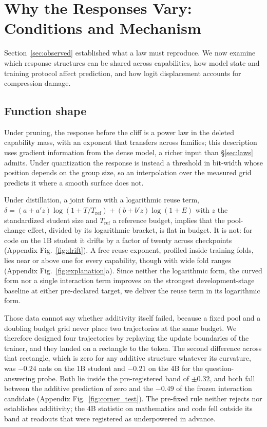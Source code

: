 \section{Why the Responses Vary: Conditions and Mechanism}
\label{sec:why}

Section~\ref{sec:observed} established what a law must reproduce. We now examine which response structures can be shared across capabilities, how model state and training protocol affect prediction, and how logit displacement accounts for compression damage.


\subsection{Function shape}
\label{sec:why_shape}

Under pruning, the response before the cliff is a power law in the deleted capability mass, with an
exponent that transfers across families; this description uses gradient information from the dense
model, a richer input than \S\ref{sec:laws} admits. Under quantization the response is instead a
threshold in bit-width whose position depends on the group size, so an interpolation over the
measured grid predicts it where a smooth surface does not.

Under distillation, a joint form with a logarithmic reuse term,
$\delta=(a+a'z)\log(1+T/T_{\mathrm{ref}})+(b+b'z)\log(1+E)$ with $z$ the standardized student size
and $T_{\mathrm{ref}}$ a reference budget, implies that the pool-change effect, divided by its logarithmic bracket, is flat in budget. It is
not: for code on the 1B student it drifts by a factor of twenty across checkpoints (Appendix
Fig.~\ref{fig:drift}). A free reuse exponent, profiled inside training folds, lies near or above one for every capability,
though with wide fold ranges (Appendix Fig.~\ref{fig:explanation}a). Since neither the logarithmic
form, the curved form nor a single interaction term improves on the strongest development-stage
baseline at either pre-declared target, we deliver the reuse term in its logarithmic form.

Those data cannot say whether additivity itself failed, because a fixed pool and a doubling budget
grid never place two trajectories at the same budget. We therefore designed four trajectories by
replaying the update boundaries of the trainer, and they landed on a rectangle to the token. The second difference across that rectangle, which is zero for any additive structure whatever its
curvature, was $-0.24$ nats on the 1B student and $-0.21$ on the 4B for the question-answering
probe. Both lie inside the pre-registered band of $\pm0.32$, and both fall between the additive
prediction of zero and the $-0.49$ of the frozen interaction candidate
(Appendix Fig.~\ref{fig:corner_test}). The pre-fixed rule neither rejects nor establishes additivity; the 4B statistic on mathematics and code
fell outside its band at readouts that were registered as underpowered in advance.



